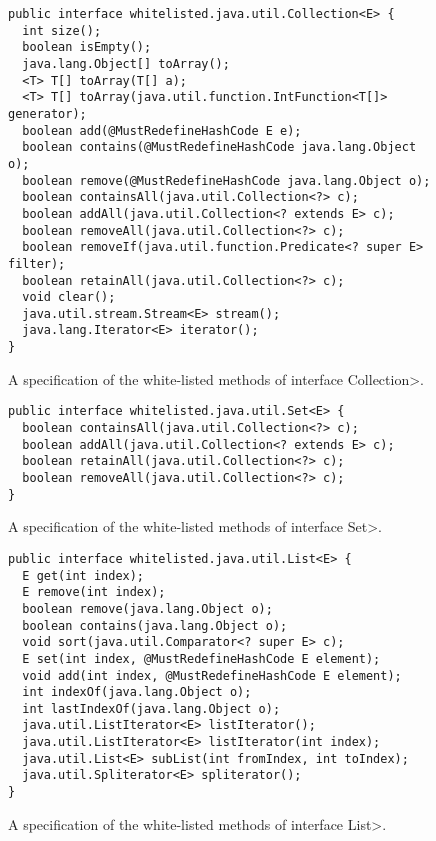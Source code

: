 \begin{figure}[t]
\begin{verbatim}
public interface whitelisted.java.util.Collection<E> {
  int size();
  boolean isEmpty();
  java.lang.Object[] toArray();
  <T> T[] toArray(T[] a);
  <T> T[] toArray(java.util.function.IntFunction<T[]> generator);
  boolean add(@MustRedefineHashCode E e);
  boolean contains(@MustRedefineHashCode java.lang.Object o);
  boolean remove(@MustRedefineHashCode java.lang.Object o);
  boolean containsAll(java.util.Collection<?> c);
  boolean addAll(java.util.Collection<? extends E> c);
  boolean removeAll(java.util.Collection<?> c);
  boolean removeIf(java.util.function.Predicate<? super E> filter);
  boolean retainAll(java.util.Collection<?> c);
  void clear();
  java.util.stream.Stream<E> stream();
  java.lang.Iterator<E> iterator();
}
\end{verbatim}
\caption{A specification of the white-listed methods of interface \<Collection>.}
\label{fig:white_listed_Collection}
\end{figure}

\begin{figure}[t]
\begin{verbatim}
public interface whitelisted.java.util.Set<E> {
  boolean containsAll(java.util.Collection<?> c);
  boolean addAll(java.util.Collection<? extends E> c);
  boolean retainAll(java.util.Collection<?> c);
  boolean removeAll(java.util.Collection<?> c);
}
\end{verbatim}
\caption{A specification of the white-listed methods of interface \<Set>.}
\label{fig:white_listed_Set}
\end{figure}

\begin{figure}[t]
\begin{verbatim}
public interface whitelisted.java.util.List<E> {
  E get(int index);
  E remove(int index);
  boolean remove(java.lang.Object o);
  boolean contains(java.lang.Object o);
  void sort(java.util.Comparator<? super E> c);
  E set(int index, @MustRedefineHashCode E element);
  void add(int index, @MustRedefineHashCode E element);
  int indexOf(java.lang.Object o);
  int lastIndexOf(java.lang.Object o);
  java.util.ListIterator<E> listIterator();
  java.util.ListIterator<E> listIterator(int index);
  java.util.List<E> subList(int fromIndex, int toIndex);
  java.util.Spliterator<E> spliterator();
}
\end{verbatim}
\caption{A specification of the white-listed methods of interface \<List>.}
\label{fig:white_listed_List}
\end{figure}

